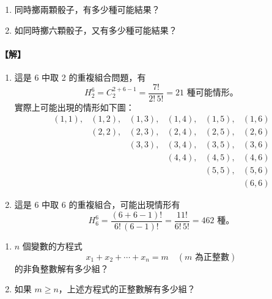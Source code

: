 \medskip
\begin{example}\label{ex:b5s-2-17}
\begin{enumerate}[label=(\roman*), topsep=2pt, itemsep=4pt]
  \item 同時擲兩顆骰子，有多少種可能結果？
  \item 如同時擲六顆骰子，又有多少種可能結果？
\end{enumerate}
\end{example}
\paragraph{【解】}
\begin{enumerate}[label=(\roman*), topsep=2pt, itemsep=4pt]
  \item 這是 6 中取 2 的重複組合問題，有
  \[
  H_2^6 = C_2^{2+6-1} = \frac{7!}{2!\, 5!} = 21 \text{ 種可能情形。}
  \]
  實際上可能出現的情形如下圖：
  \[
  \begin{array}{cccccc}
  (1, 1), & (1, 2), & (1, 3), & (1, 4), & (1, 5), & (1, 6) \\
          & (2, 2), & (2, 3), & (2, 4), & (2, 5), & (2, 6) \\
          &         & (3, 3), & (3, 4), & (3, 5), & (3, 6) \\
          &         &         & (4, 4), & (4, 5), & (4, 6) \\
          &         &         &         & (5, 5), & (5, 6) \\
          &         &         &         &         & (6, 6)
  \end{array}
  \]
  \item 這是 6 中取 6 的重複組合，可能出現情形有
  \[
  H_6^6 = \frac{(6+6-1)!}{6!\, (6-1)!} = \frac{11!}{6!\, 5!} = 462 \text{ 種。} \tag*{\#}
  \]
\end{enumerate}

\medskip
\begin{discussion}\label{disc:b5s-2-9}
\begin{enumerate}[label=(\roman*), topsep=2pt, itemsep=4pt]
  \item $n$ 個變數的方程式
  \[
  x_1 + x_2 + \cdots + x_n = m \quad (m \text{ 為正整數})
  \]
  的非負整數解有多少組？
  \item 如果 $m \ge n$，上述方程式的正整數解有多少組？
\end{enumerate}
\end{discussion}
